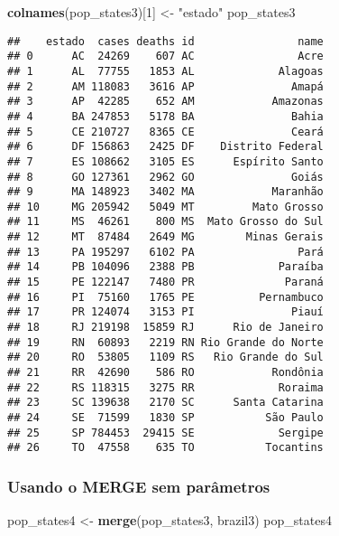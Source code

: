 \documentclass[
]{article}
\newenvironment{Shaded}{\begin{snugshade}}{\end{snugshade}}
\newcommand{\DecValTok}[1]{\textcolor[rgb]{0.00,0.00,0.81}{#1}}
\newcommand{\KeywordTok}[1]{\textcolor[rgb]{0.13,0.29,0.53}{\textbf{#1}}}
\newcommand{\NormalTok}[1]{#1}
\newcommand{\StringTok}[1]{\textcolor[rgb]{0.31,0.60,0.02}{#1}}
\begin{document}
\begin{Shaded}
\begin{Highlighting}[]
\KeywordTok{colnames}\NormalTok{(pop\_states3)[}\DecValTok{1}\NormalTok{] \textless{}{-}}\StringTok{ "estado"}
\NormalTok{pop\_states3}
\end{Highlighting}
\end{Shaded}

\begin{verbatim}
##    estado  cases deaths id                name
## 0      AC  24269    607 AC                Acre
## 1      AL  77755   1853 AL             Alagoas
## 2      AM 118083   3616 AP               Amapá
## 3      AP  42285    652 AM            Amazonas
## 4      BA 247853   5178 BA               Bahia
## 5      CE 210727   8365 CE               Ceará
## 6      DF 156863   2425 DF    Distrito Federal
## 7      ES 108662   3105 ES      Espírito Santo
## 8      GO 127361   2962 GO               Goiás
## 9      MA 148923   3402 MA            Maranhão
## 10     MG 205942   5049 MT         Mato Grosso
## 11     MS  46261    800 MS  Mato Grosso do Sul
## 12     MT  87484   2649 MG        Minas Gerais
## 13     PA 195297   6102 PA                Pará
## 14     PB 104096   2388 PB             Paraíba
## 15     PE 122147   7480 PR              Paraná
## 16     PI  75160   1765 PE          Pernambuco
## 17     PR 124074   3153 PI               Piauí
## 18     RJ 219198  15859 RJ      Rio de Janeiro
## 19     RN  60893   2219 RN Rio Grande do Norte
## 20     RO  53805   1109 RS   Rio Grande do Sul
## 21     RR  42690    586 RO            Rondônia
## 22     RS 118315   3275 RR             Roraima
## 23     SC 139638   2170 SC      Santa Catarina
## 24     SE  71599   1830 SP           São Paulo
## 25     SP 784453  29415 SE             Sergipe
## 26     TO  47558    635 TO           Tocantins
\end{verbatim}

\hypertarget{usando-o-merge-sem-paruxe2metros}{%
\subsubsection{Usando o MERGE sem
parâmetros}\label{usando-o-merge-sem-paruxe2metros}}

\begin{Shaded}
\begin{Highlighting}[]
\NormalTok{pop\_states4 \textless{}{-}}\StringTok{ }\KeywordTok{merge}\NormalTok{(pop\_states3, brazil3)}
\NormalTok{pop\_states4}
\end{Highlighting}
\end{Shaded}
\end{document}
